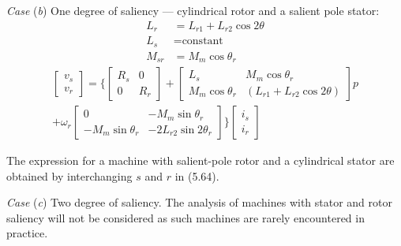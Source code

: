 \documentclass[a4paper,numbers=noenddot,12pt]{scrbook}
\begin{document}
            \noindent \textit{Case} (\textit{b}) One degree of saliency --- cylindrical rotor and a salient pole stator:	
            \begin{equation*}
                \begin{aligned}
                    L_r & = L_{r1} + L_{r2} \cos 2\theta \\
                    L_s & = \text{constant} \\
                    M_{sr} & = M_m \cos \theta_r  
                \end{aligned}
            \end{equation*}
            \begin{multline}
                \begin{bmatrix}
                    v_s \\ v_r
                \end{bmatrix} = \Bigg\{
                    \begin{bmatrix}
                        R_s & 0 \\ 0 & R_r 
                    \end{bmatrix} +
                    \begin{bmatrix}
                        L_s & M_m \cos \theta_r \\
                        M_m \cos \theta_r & (L_{r1} + L_{r2} \cos 2 \theta)
                    \end{bmatrix}p \\
                    + \omega_r
                    \begin{bmatrix}
                        0 & - M_m \sin \theta_r \\
                        - M_m \sin \theta_r & -2 L_{r2} \sin 2 \theta_r
                    \end{bmatrix}
                \Bigg\}
                \begin{bmatrix}
                    i_s \\
                    i_r
                \end{bmatrix}
            \end{multline}

            The expression for a machine with salient-pole rotor and a cylindrical stator are obtained by interchanging $s$ and $r$ in (5.64).

            \vspace{1em}

            \noindent \textit{Case} (\textit{c}) Two degree of saliency.  The analysis of machines with stator and rotor saliency will not be considered as such machines are rarely encountered in practice.
\end{document}
